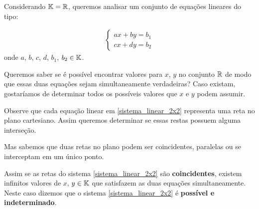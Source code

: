 Considerando $\mathbb{K} = \mathbb{R}$, queremos analisar um conjunto de equações lineares do tipo:

\begin{align}
    \begin{cases}\label{sistema_linear_2x2}
        ax + by = b_1\\
        cx + dy = b_2
    \end{cases}
\end{align}
onde $a$, $b$, $c$, $d$, $b_1$, $b_2 \in \mathbb{K}$.

Queremos saber se é possível encontrar valores para $x$, $y$ no conjunto $\mathbb{R}$ de modo que essas duas equações sejam simultaneamente verdadeiras? Caso existam, gostaríamos de determinar todos os possíveis valores que $x$ e $y$ podem assumir.

Observe que cada equação linear em \eqref{sistema_linear_2x2} representa uma reta no plano cartesiano. Assim queremos determinar se essas restas possuem alguma interseção.

Mas sabemos que duas retas no plano podem ser coincidentes, paralelas ou se interceptam em um único ponto.

Assim se as retas do sistema \eqref{sistema_linear_2x2} são \textbf{coincidentes}, existem infinitos valores de $x$, $y \in \mathbb{K}$ que satisfazem as duas equações simultaneamente. Neste caso dizemos que o sistema \eqref{sistema_linear_2x2} é \textbf{possível e indeterminado}.

\begin{center}
\end{center}

